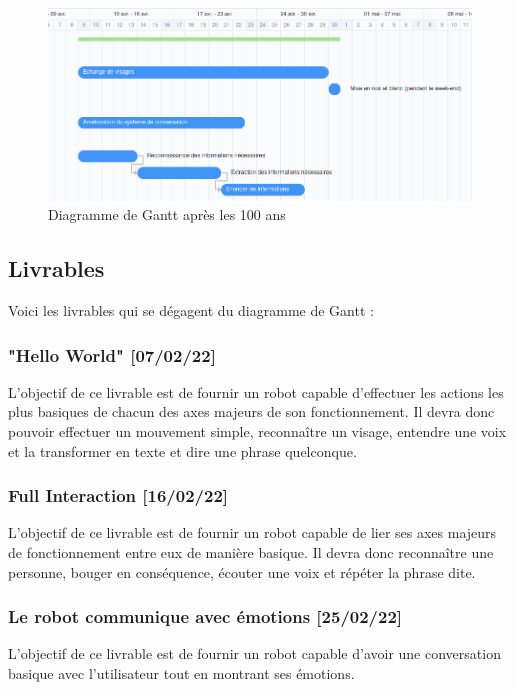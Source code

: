 \begin{center}
    \begin{figure}[!ht]
        \includegraphics[width=\textwidth]{GANTT_apres_100_ans.png}
        \caption{Diagramme de Gantt après les 100 ans}
        \label{fig:gantt_apres}
        \end{figure}
\end{center}

\newpage

\subsection{Livrables}
Voici les livrables qui se dégagent du diagramme de Gantt :

\subsubsection{"Hello World" [07/02/22]}
L'objectif de ce livrable est de fournir un robot capable d'effectuer les actions les plus basiques de chacun des axes majeurs de son fonctionnement. Il devra donc pouvoir effectuer un mouvement simple, reconnaître un visage, entendre une voix et la transformer en texte et dire une phrase quelconque. 

\subsubsection{Full Interaction [16/02/22]}
L'objectif de ce livrable est de fournir un robot capable de lier ses axes majeurs de fonctionnement entre eux de manière basique. Il devra donc reconnaître une personne, bouger en conséquence, écouter une voix et répéter la phrase dite.

\subsubsection{Le robot communique avec émotions [25/02/22]}
L'objectif de ce livrable est de fournir un robot capable d'avoir une conversation basique avec l'utilisateur tout en montrant ses émotions.

